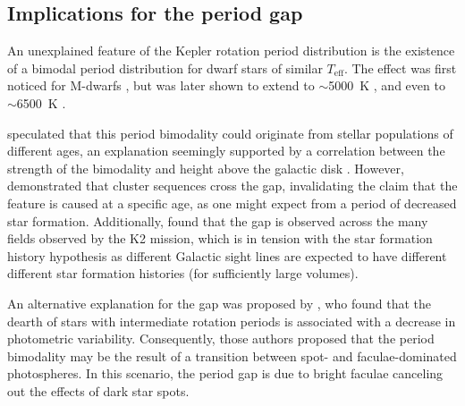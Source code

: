 \documentclass[linenumbers,trackchanges,twocolumn]{aastex631}
\newcommand{\teff}{\ensuremath{T_{\mathrm{eff}}}\xspace}
\begin{document}
\subsection{Implications for the period gap} \label{subsec:gap}

An unexplained feature of the Kepler rotation period distribution is the existence of a bimodal period distribution for dwarf stars of similar \teff. The effect was first noticed for M-dwarfs \citep{McQuillan2013b}, but was later shown to extend to $\sim$5000~K \citep{Reinhold2013, McQuillan2014, ReinholdHekker2020}, and even to $\sim$6500~K \citep{Davenport2017}. 

\citet{McQuillan2013b, McQuillan2014} speculated that this period bimodality could originate from stellar populations of different ages, an explanation seemingly supported by a correlation between the strength of the bimodality and height above the galactic disk \citep{DavenportCovey2018}. However, \citet{Curtis2020} demonstrated that cluster sequences cross the gap, invalidating the claim that the feature is caused at a specific age, as one might expect from a period of decreased star formation. Additionally, \citet{Gordon2021} found that the gap is observed across the many fields observed by the K2 mission, which is in tension with the star formation history hypothesis as different Galactic sight lines are expected to have different different star formation histories (for sufficiently large volumes). 

An alternative explanation for the gap was proposed by \citet{Reinhold2019}, who found that the dearth of stars with intermediate rotation periods is associated with a decrease in photometric variability. Consequently, those authors proposed that the period bimodality may be the result of a transition between spot- and faculae-dominated photospheres. In this scenario, the period gap is due to bright faculae canceling out the effects of dark star spots. 
\end{document}
